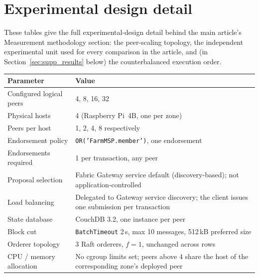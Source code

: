 \clearpage
\section{Experimental design detail}
\label{sec:supp_design}

These tables give the full experimental-design detail behind the main
article's Measurement methodology section: the peer-scaling topology, the
independent experimental unit used for every comparison in the article,
and (in Section~\ref{sec:supp_results} below) the counterbalanced
execution order.

\begin{widetab}
\caption{Topology and routing used for each peer-scaling configuration.}
\label{tab:topology}
\small
\begin{tabularx}{\tblwidth}{@{}lX@{}}
\toprule
Parameter & Value \\
\midrule
Configured logical peers  & 4, 8, 16, 32 \\
Physical hosts            & 4 (Raspberry Pi~4B, one per zone) \\
Peers per host            & 1, 2, 4, 8 respectively \\
Endorsement policy        & \texttt{OR('FarmMSP.member')}, one endorsement \\
Endorsements required     & 1 per transaction, any peer \\
Proposal selection        & Fabric Gateway service default (discovery-based);
                            not application-controlled \\
Load balancing            & Delegated to Gateway service discovery; the
                            client issues one submission per transaction \\
State database            & CouchDB 3.2, one instance per peer \\
Block cut                 & \texttt{BatchTimeout} 2\,s, max 10 messages,
                            512\,kB preferred size \\
Orderer topology          & 3 Raft orderers, $f{=}1$, unchanged across rows \\
CPU / memory allocation   & No cgroup limits set; peers above 4 share the
                            host of the corresponding zone's deployed peer \\
\bottomrule
\end{tabularx}
\end{widetab}

